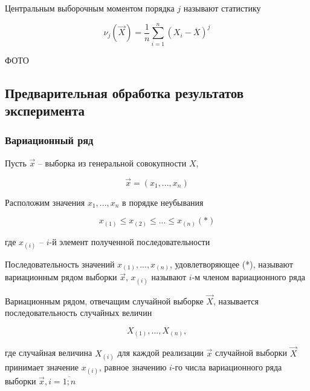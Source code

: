 \begin{defenition}
    Центральным выборочным моментом порядка $j$ называют статистику

    \begin{equation*}
        \nu_j (\vec X) = \frac{1}{n} \sum_{i=1}^n (X_i - \overline X)^j
    \end{equation*}
\end{defenition}

ФОТО

\subsection{Предварительная обработка результатов эксперимента}

\subsubsection{Вариационный ряд}

Пусть $\vec x$ -- выборка из генеральной совокупности $X$,

\begin{equation*}
    \vec x = (x_1, ..., x_n)
\end{equation*}

Расположим значения $x_1,...,x_n$ в порядке неубывания

\begin{equation*}
    x_{(1)} \le x_{(2)} \le ... \le x_{(n)} (*)
\end{equation*}

где $x_{(i)}$ -- $i$-й элемент полученной последовательности

\begin{defenition}
    Последовательность значений $x_{(1)},...,x_{(n)}$, удовлетворяющее
    (*), называют вариационным рядом выборки $\vec x$, $x_{(i)}$
    называют $i$-м членом вариационного ряда
\end{defenition}

\begin{defenition}
    Вариационным рядом, отвечащим случайной выборке $\vec X$, называется
    последовательность случайных величин

    \begin{equation*}
        X_{(1)},...,X_{(n)},
    \end{equation*}

    где случайная величина $X_{(i)}$ для каждой реализации $\vec x$
    случайной выборки $\vec X$ принимает значение $x_{(i)}$, равное
    значению $i$-го числа вариационного ряда выборки
    $\vec x, i=\overline{1;n}$
\end{defenition}

